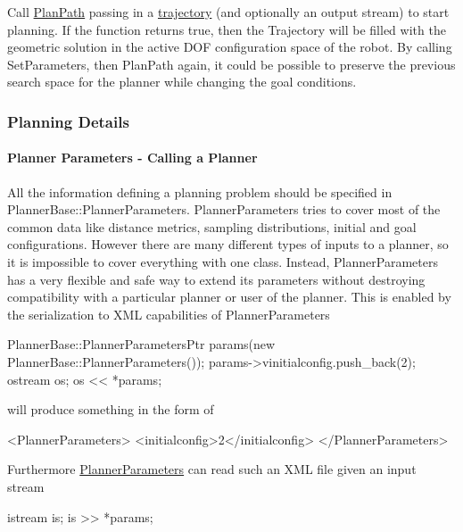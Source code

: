 \begin{DoxyItemize}
\item Call \hyperlink{classOpenRAVE_1_1PlannerBase_a7ce22311b1f81ec6b9bacdf457d4631a}{PlanPath} passing in a \hyperlink{classOpenRAVE_1_1TrajectoryBase}{trajectory} (and optionally an output stream) to start planning. If the function returns true, then the Trajectory will be filled with the geometric solution in the active DOF configuration space of the robot. By calling SetParameters, then PlanPath again, it could be possible to preserve the previous search space for the planner while changing the goal conditions.
\end{DoxyItemize}\hypertarget{arch__planner_planner_planning}{}\subsubsection{Planning Details}\label{arch__planner_planner_planning}
\hypertarget{arch__planner_planner_parameters}{}\paragraph{Planner Parameters -\/ Calling a Planner}\label{arch__planner_planner_parameters}
All the information defining a planning problem should be specified in PlannerBase::PlannerParameters. {\ttfamily PlannerParameters} tries to cover most of the common data like distance metrics, sampling distributions, initial and goal configurations. However there are many different types of inputs to a planner, so it is impossible to cover everything with one class. Instead, {\ttfamily PlannerParameters} has a very flexible and safe way to extend its parameters without destroying compatibility with a particular planner or user of the planner. This is enabled by the serialization to XML capabilities of {\ttfamily PlannerParameters}


\begin{DoxyCode}
PlannerBase::PlannerParametersPtr params(new PlannerBase::PlannerParameters());
params->vinitialconfig.push_back(2);
ostream os;
os << *params;
\end{DoxyCode}


will produce something in the form of \begin{DoxyVerb}
<PlannerParameters>
  <initialconfig>2</initialconfig>
</PlannerParameters>
\end{DoxyVerb}


Furthermore \hyperlink{classOpenRAVE_1_1PlannerBase_1_1PlannerParameters}{PlannerParameters} can read such an XML file given an input stream \begin{DoxyVerb}
istream is;
is >> *params;
\end{DoxyVerb}


